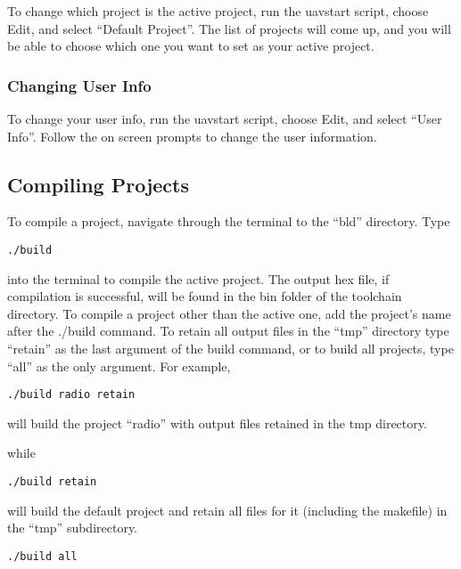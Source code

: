 \documentclass[a4paper, oneside, 11pt, titlepage, onecolumn, openright]{article}
\begin{document}
To change which project is the active project, run the uavstart script, choose Edit, and select ``Default Project''. The list of projects will come up, and you will be able to choose which one you want to set as your active project.

\subsubsection{Changing User Info}
			\label{sss:Change User Info} 
To change your user info, run the uavstart script, choose Edit, and select ``User Info''. Follow the on screen prompts to change the user information.

\subsection{Compiling Projects}
			\label{ss:Compiling Projects}

To compile a project, navigate through the terminal to the ``bld'' directory. Type

\begin{lstlisting}
./build
\end{lstlisting}

into the terminal to compile the active project. The output hex file, if compilation is successful, will be found in the bin folder of the toolchain directory.
To compile a project other than the active one, add the project's name after the ./build command. To retain all output files in the ``tmp'' directory type ``retain'' as the last argument of the build command, or to build all projects, type ``all'' as the only argument. For example, \\

\begin{lstlisting}
./build radio retain
\end{lstlisting}

will build the project ``radio'' with output files retained in the tmp directory.

while\\

\begin{lstlisting}
./build retain
\end{lstlisting}

will build the default project and retain all files for it (including the makefile) in the ``tmp'' subdirectory.\\

\begin{lstlisting}
./build all
\end{lstlisting}
\end{document}
